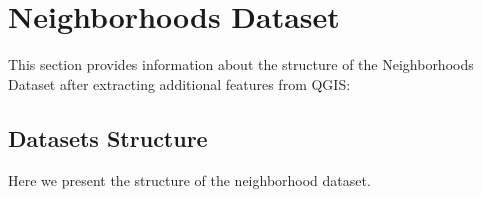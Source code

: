 
\section{Neighborhoods Dataset}

This section provides information about the structure of the Neighborhoods Dataset after extracting additional features from QGIS:


\subsection{Datasets Structure}

Here we present the structure of the neighborhood dataset. 

